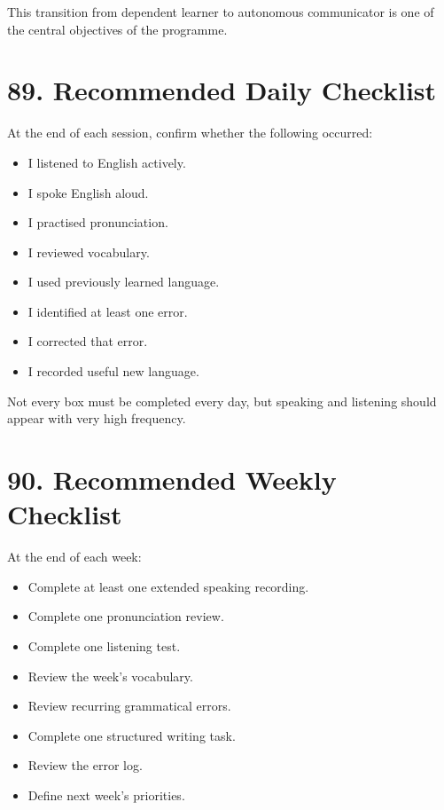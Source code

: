 This transition from dependent learner to autonomous communicator is one of the central objectives of the programme.

\section*{89. Recommended Daily Checklist}

At the end of each session, confirm whether the following occurred:

\begin{itemize}
    \item[$\square$] I listened to English actively.
    \item[$\square$] I spoke English aloud.
    \item[$\square$] I practised pronunciation.
    \item[$\square$] I reviewed vocabulary.
    \item[$\square$] I used previously learned language.
    \item[$\square$] I identified at least one error.
    \item[$\square$] I corrected that error.
    \item[$\square$] I recorded useful new language.
\end{itemize}

Not every box must be completed every day, but speaking and listening should appear with very high frequency.

\section*{90. Recommended Weekly Checklist}

At the end of each week:

\begin{itemize}
    \item[$\square$] Complete at least one extended speaking recording.
    \item[$\square$] Complete one pronunciation review.
    \item[$\square$] Complete one listening test.
    \item[$\square$] Review the week's vocabulary.
    \item[$\square$] Review recurring grammatical errors.
    \item[$\square$] Complete one structured writing task.
    \item[$\square$] Review the error log.
    \item[$\square$] Define next week's priorities.
\end{itemize}

